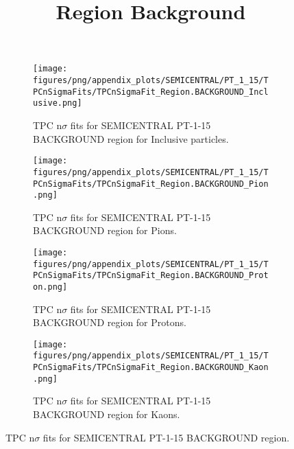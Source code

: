             \begin{figure}[H]
                \title{Region Background}
                \begin{subfigure}[b]{0.5\textwidth}
                    \centering
                    \texttt{[image: figures/png/appendix\_plots/SEMICENTRAL/PT\_1\_15/TPCnSigmaFits/TPCnSigmaFit\_Region.BACKGROUND\_Inclusive.png]}
                    \caption{TPC n$\sigma$ fits for SEMICENTRAL PT-1-15 BACKGROUND region for Inclusive particles.}
                    \label{fig:appendix_SEMICENTRAL_PT-1-15_BACKGROUND_Inclusive}
                \end{subfigure}
                \begin{subfigure}[b]{0.5\textwidth}
                    \centering
                    \texttt{[image: figures/png/appendix\_plots/SEMICENTRAL/PT\_1\_15/TPCnSigmaFits/TPCnSigmaFit\_Region.BACKGROUND\_Pion.png]}
                    \caption{TPC n$\sigma$ fits for SEMICENTRAL PT-1-15 BACKGROUND region for Pions.}
                    \label{fig:appendix_SEMICENTRAL_PT-1-15_BACKGROUND_Pion}
                \end{subfigure}
                \begin{subfigure}[b]{0.5\textwidth}
                    \centering
                    \texttt{[image: figures/png/appendix\_plots/SEMICENTRAL/PT\_1\_15/TPCnSigmaFits/TPCnSigmaFit\_Region.BACKGROUND\_Proton.png]}
                    \caption{TPC n$\sigma$ fits for SEMICENTRAL PT-1-15 BACKGROUND region for Protons.}
                    \label{fig:appendix_SEMICENTRAL_PT-1-15_BACKGROUND_Proton}
                \end{subfigure}
                \begin{subfigure}[b]{0.5\textwidth}
                    \centering
                    \texttt{[image: figures/png/appendix\_plots/SEMICENTRAL/PT\_1\_15/TPCnSigmaFits/TPCnSigmaFit\_Region.BACKGROUND\_Kaon.png]}
                    \caption{TPC n$\sigma$ fits for SEMICENTRAL PT-1-15 BACKGROUND region for Kaons.}
                    \label{fig:appendix_SEMICENTRAL_PT-1-15_BACKGROUND_Kaon}
                \end{subfigure}
                \caption{TPC n$\sigma$ fits for SEMICENTRAL PT-1-15 BACKGROUND region.}
                \label{fig:appendix_SEMICENTRAL_PT-1-15_BACKGROUND}
            \end{figure}
            \clearpage
            
    
